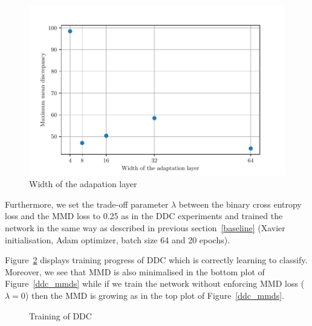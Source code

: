\begin{figure}
	\includegraphics[width=\textwidth]{img/adaptation_layer_width.pdf}
	\caption{Width of the adapation layer}
	\label{adaptation_layer}
\end{figure}

Furthermore, we set the trade-off parameter \(\lambda\)
between the binary cross entropy loss
and the MMD loss to 0.25 as in the DDC experiments
and trained the network in the same way as described in previous section~\ref{baseline}
(Xavier initialisation, Adam optimizer, batch size 64 and 20 epochs).

Figure~\ref{ddc_training} displays training progress of DDC
which is correctly learning to classify.
Moreover, we see that MMD is also minimalised in the bottom plot of Figure~\ref{ddc_mmds}
while if we train the network without enforcing MMD loss (\(\lambda = 0\))
then the MMD is growing as in the top plot of Figure~\ref{ddc_mmds}.

\begin{figure}
\caption{Training of DDC}
\label{ddc_training}
\end{figure}


